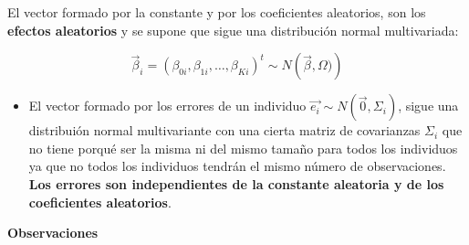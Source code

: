 \documentclass[
]{book}
\providecommand{\tightlist}{%
  \setlength{\itemsep}{0pt}\setlength{\parskip}{0pt}}
\begin{document}
El vector formado por la constante y por los coeficientes aleatorios, son los \textbf{efectos aleatorios} y se supone que sigue una distribución normal multivariada:

\[\vec{\beta}_i = (\beta_{0i},\beta_{1i},\ldots,\beta_{Ki})^t \sim N\left(\vec{\beta}, \Omega) \right)\]

\begin{itemize}
\tightlist
\item
  El vector formado por los errores de un individuo \(\vec{e_i} \sim N(\vec{0},\Sigma_i)\), sigue una distribuión normal multivariante con una cierta matriz de covarianzas \(\Sigma_i\) que no tiene porqué ser la misma ni del mismo tamaño para todos los individuos ya que no todos los individuos tendrán el mismo número de observaciones. \textbf{Los errores son independientes de la constante aleatoria y de los coeficientes aleatorios}.
\end{itemize}

\textbf{Observaciones}
\end{document}

